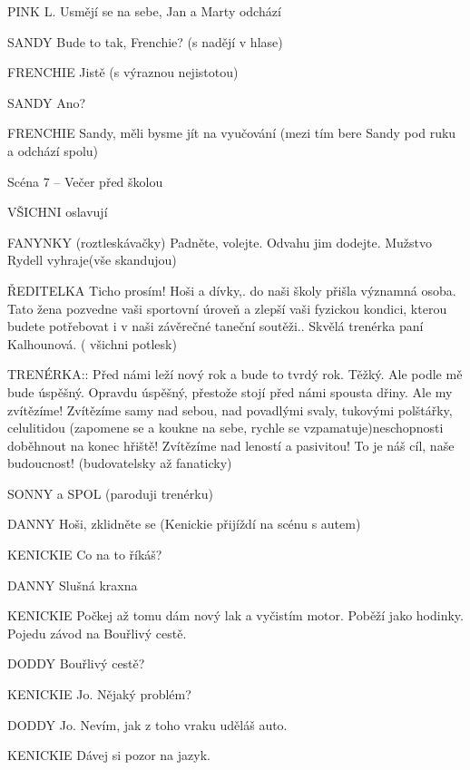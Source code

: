 PINK L.         Usmějí se na sebe, Jan a Marty odchází

SANDY        Bude to tak, Frenchie? (s nadějí v hlase)

FRENCHIE        Jistě (s výraznou nejistotou)

SANDY        Ano? 

FRENCHIE        Sandy, měli bysme jít na vyučování (mezi tím bere Sandy pod ruku a         odchází spolu)





Scéna 7 – Večer před školou

VŠICHNI                         oslavují 

      FANYNKY (roztleskávačky) Padněte, volejte. Odvahu jim dodejte. Mužstvo Rydell                                vyhraje(vše skandujou)

ŘEDITELKA         Ticho prosím! Hoši a dívky,. do naši školy přišla významná osoba.                  Tato žena pozvedne vaši sportovní úroveň a zlepší vaši fyzickou kondici,         kterou budete potřebovat i v naši závěrečné taneční soutěži.. Skvělá         trenérka paní Kalhounová. ( všichni potlesk)

TRENÉRKA::         Před námi leží nový rok a bude to tvrdý rok. Těžký. Ale podle mě bude         úspěšný. Opravdu úspěšný, přestože stojí před námi spousta dřiny.  Ale         my zvítězíme! Zvítězíme samy nad sebou, nad povadlými svaly,                 tukovými polštářky, celulitidou (zapomene se a koukne na sebe, rychle         se vzpamatuje)neschopnosti doběhnout na konec hřiště! Zvítězíme nad         leností a pasivitou!  To je náš cíl, naše budoucnost! (budovatelsky až         fanaticky)    

 SONNY a SPOL  (paroduji trenérku)

 DANNY        Hoši, zklidněte se  (Kenickie přijíždí na scénu s autem)

KENICKIE        Co na to říkáš?

DANNY        Slušná kraxna

KENICKIE        Počkej až tomu dám nový lak a vyčistím motor. Poběží jako hodinky.                     Pojedu závod na Bouřlivý cestě. 

DODDY        Bouřlivý cestě?

KENICKIE        Jo. Nějaký problém?

DODDY        Jo. Nevím, jak z toho vraku uděláš auto. 

KENICKIE        Dávej si pozor na jazyk.

